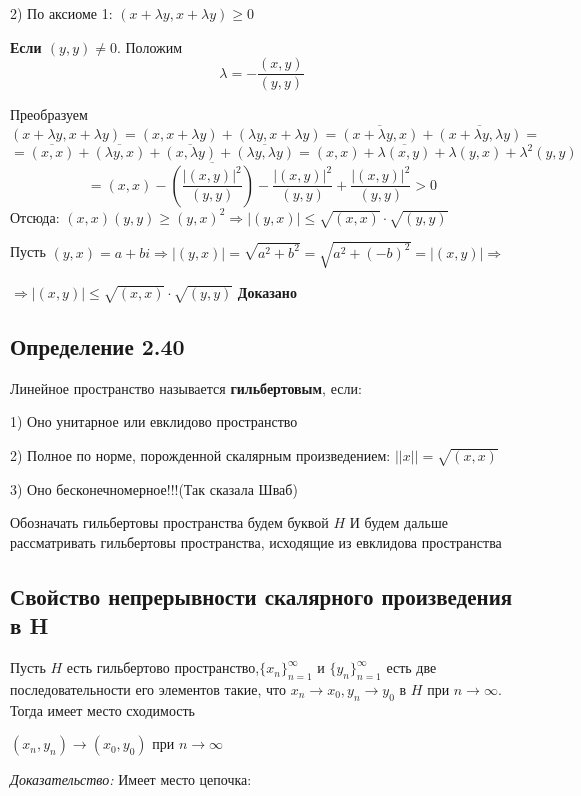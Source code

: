 \documentclass[12pt]{article}
\begin{document}
2)		По аксиоме 1:
		$(x + \lambda y , x + \lambda y) \ge 0$
		
	\textbf{Если $(y,y) \neq 0$}. Положим 
$$\lambda = -\frac{(x,y)}{(y,y)}$$

Преобразуем
	$$(x + \lambda y , x + \lambda y) = (x , x + \lambda y) + (\lambda y , x + \lambda y) 	= 
	\overline{(x + \lambda y , x)} + \overline{(x + \lambda y , \lambda y)} =
	$$
$$ = \overline{(x,x)} + \overline{(\lambda y ,x)} + 
\overline{(x, \lambda y)} + \overline{(\lambda y , \lambda y)} = (x,x) + \overline{\lambda(x, y)} + \lambda( y , x) + \lambda^2 (y,y)
$$
$$
= (x,x) - \overline{(\frac{|(x,y)|^2}{(y,y)})} - \frac{|(x,y)|^2}{(y,y)} + \frac{|(x,y)|^2}{(y,y)} > 0
$$
Отсюда:
$(x,x)(y,y) \ge (y,x)^2 \Rightarrow |(y,x)| \leq \sqrt{(x,x)} \cdot \sqrt{(y,y)} $

Пусть $(y,x) = a + bi \Rightarrow |(y,x)| = \sqrt{a^2 + b^2}=  \sqrt{a^2 + (-b)^2} = |(x,y)| \Rightarrow$

$ \Rightarrow |(x,y)| \leq \sqrt{(x,x)} \cdot \sqrt{(y,y)}$ \textbf{Доказано}

\subsection*{Определение 2.40}
	Линейное пространство называется \textbf{гильбертовым}, если:
	
	1) Оно унитарное или евклидово пространство
	
	2) Полное по норме, порожденной скалярным произведением: 
	$||x|| = \sqrt{(x,x)} $
	
	3) Оно бесконечномерное!!!(Так сказала Шваб)

Обозначать гильбертовы пространства будем буквой $H$
И будем дальше рассматривать гильбертовы пространства, исходящие из
евклидова пространства 

\subsection{Свойство непрерывности скалярного произведения в H}
	Пусть $H$ есть гильбертово пространство,$\{ x_n \}_{n = 1}^{\infty}$ и $\{ y_n \}_{n = 1}^{\infty}$ есть две последовательности его элементов такие,
что $x_n \to x_0, y_n \to y_0$ в $H$ при $n \to \infty$. Тогда имеет место сходимость
	\begin{center}
		$(x_n, y_n) \to (x_0, y_0)$ при $ n \to \infty$
	\end{center}

\textit{Доказательство:} Имеет место цепочка:
\end{document}
